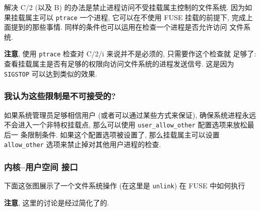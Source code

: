 \documentclass[nofonts]{ctexart}
\begin{document}
解决 C/2 (以及 B) 的办法是禁止进程访问不受挂载属主控制的文件系统.
因为如果挂载属主可以 \texttt{ptrace} 一个进程, 它可以在不使用 FUSE
挂载的前提下, 完成上面提到的那些事情.
同样的条件也可以运用在检查一个进程是否允许访问 文件系统.

\textbf{注意}, 使用 \texttt{ptrace} 检查对 C/2/i 来说并不是必须的,
只需要作这个检查就 足够了:
查看挂载属主是否有足够的权限向访问文件系统的进程发送信号. 这是因为
\texttt{SIGSTOP} 可以达到类似的效果.

\subsubsection{我认为这些限制是不可接受的?}\label{ux6211ux8ba4ux4e3aux8fd9ux4e9bux9650ux5236ux662fux4e0dux53efux63a5ux53d7ux7684}

如果系统管理员足够相信用户 (或者可以通过某些方式来保证),
确保系统进程永远 不会进入一个非特权挂载点, 那么可以使用
\texttt{user\_allow\_other} 配置选项来放松最后一 条限制条件.
如果这个配置选项被设置了, 那么挂载属主可以设置 \texttt{allow\_other}
选项来禁止掉对其他用户进程的检查.

\subsubsection{内核--用户空间
接口}\label{ux5185ux6838ux7528ux6237ux7a7aux95f4-ux63a5ux53e3}

下面这张图展示了一个文件系统操作 (在这里是 \texttt{unlink}) 在 FUSE
中如何执行

\textbf{注意}, 这里的讨论是经过简化了的.
\end{document}
